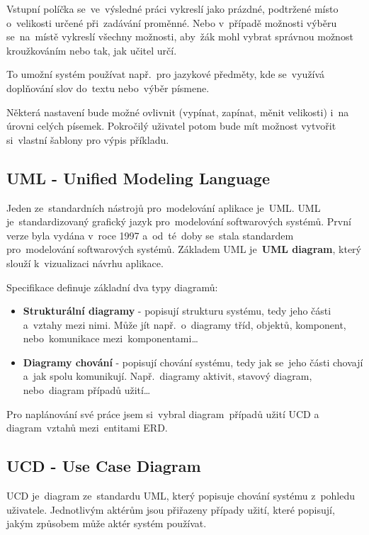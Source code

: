 \documentclass[14pt,a4paper]{article}
\begin{document}
        Vstupní políčka se~ve~výsledné práci vykreslí jako prázdné, podtržené místo o~velikosti určené při~zadávání proměnné.
        Nebo v~případě možnosti výběru se~na~místě vykreslí všechny možnosti, aby~žák mohl vybrat správnou možnost kroužkováním nebo tak, jak učitel určí.
        
        To umožní systém používat např.~pro jazykové předměty, kde se~využívá doplňování slov do~textu nebo~výběr písmene.

        Některá nastavení bude možné ovlivnit (vypínat, zapínat, měnit velikosti) i~na úrovni celých písemek. Pokročilý uživatel potom bude mít možnost vytvořit si~vlastní šablony pro výpis příkladu.

        \subsection{UML - Unified Modeling Language}
        Jeden ze~standardních nástrojů pro~modelování aplikace je~\textsc{UML}. \textsc{UML} je~standardizovaný grafický jazyk pro~modelování softwarových systémů. První verze byla vydána v~roce 1997 a~od~té~doby se~stala standardem pro~modelování softwarových systémů.
        Základem \textsc{UML} je~\textbf{UML diagram}, který slouží k~vizualizaci návrhu aplikace. \parencite{uml:diagram}
        
        Specifikace definuje základní dva typy diagramů:
        \begin{itemize}
            \item \textbf{Strukturální diagramy} - popisují strukturu systému, tedy jeho části a~vztahy mezi nimi. Může jít např.~o~diagramy tříd, objektů, komponent, nebo~komunikace mezi~komponentami\dots
            \item \textbf{Diagramy chování} - popisují chování systému, tedy jak se~jeho části chovají a~jak spolu komunikují. Např.~diagramy aktivit, stavový diagram, nebo~diagram případů užití\dots
        \end{itemize}

        Pro naplánování své práce jsem si~vybral diagram~případů užití \textsc{UCD} a diagram~vztahů mezi~entitami \textsc{ERD}.

        \subsection{UCD - Use Case Diagram}
        \textsc{UCD} je~diagram ze~standardu \textsc{UML}, který popisuje chování systému z~pohledu uživatele.
        Jednotlivým aktérům jsou přiřazeny případy užití, které popisují, jakým způsobem může aktér systém používat.
\end{document}
